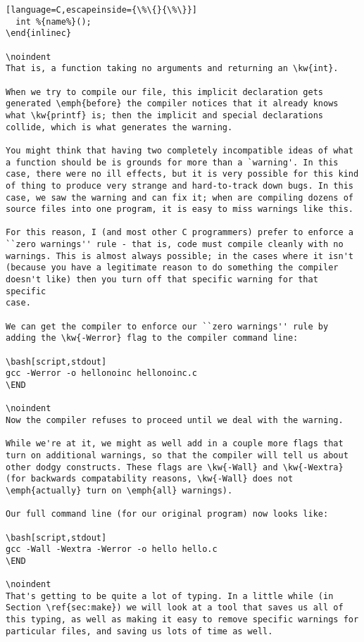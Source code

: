\documentclass[a4paper,10pt]{article}
\newcommand{\kw}[1]{\texttt{#1}}
\begin{document}
\begin{lstlisting}[language=C,escapeinside={\%\{}{\%\}}]
  int %{name%}();
\end{inlinec}

\noindent
That is, a function taking no arguments and returning an \kw{int}.

When we try to compile our file, this implicit declaration gets
generated \emph{before} the compiler notices that it already knows
what \kw{printf} is; then the implicit and special declarations
collide, which is what generates the warning.

You might think that having two completely incompatible ideas of what
a function should be is grounds for more than a `warning'. In this
case, there were no ill effects, but it is very possible for this kind
of thing to produce very strange and hard-to-track down bugs. In this
case, we saw the warning and can fix it; when are compiling dozens of
source files into one program, it is easy to miss warnings like this.

For this reason, I (and most other C programmers) prefer to enforce a
``zero warnings'' rule - that is, code must compile cleanly with no
warnings. This is almost always possible; in the cases where it isn't
(because you have a legitimate reason to do something the compiler
doesn't like) then you turn off that specific warning for that specific
case.

We can get the compiler to enforce our ``zero warnings'' rule by
adding the \kw{-Werror} flag to the compiler command line:

\bash[script,stdout]
gcc -Werror -o hellonoinc hellonoinc.c
\END

\noindent
Now the compiler refuses to proceed until we deal with the warning.

While we're at it, we might as well add in a couple more flags that
turn on additional warnings, so that the compiler will tell us about
other dodgy constructs. These flags are \kw{-Wall} and \kw{-Wextra}
(for backwards compatability reasons, \kw{-Wall} does not
\emph{actually} turn on \emph{all} warnings).

Our full command line (for our original program) now looks like:

\bash[script,stdout]
gcc -Wall -Wextra -Werror -o hello hello.c
\END

\noindent
That's getting to be quite a lot of typing. In a little while (in
Section \ref{sec:make}) we will look at a tool that saves us all of
this typing, as well as making it easy to remove specific warnings for
particular files, and saving us lots of time as well.


\end{lstlisting}
\end{document}
